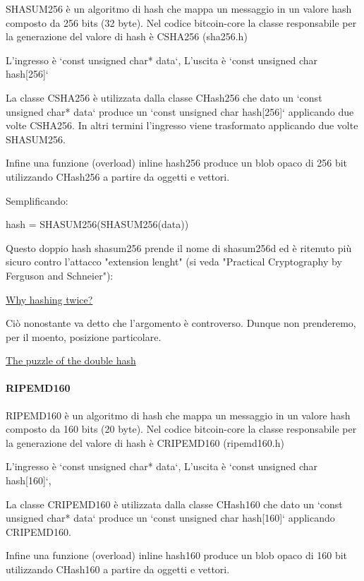 \documentclass{book}
\theoremstyle{definition}
\begin{document}
SHASUM256 è un algoritmo di hash che mappa un messaggio in un valore hash composto da 256 bits (32 byte).
Nel codice bitcoin-core la classe responsabile per la generazione del valore di hash è CSHA256 (sha256.h)

L'ingresso è `const unsigned char* data`,
L'uscita è `const unsigned char hash[256]`

La classe CSHA256 è utilizzata dalla classe CHash256 che dato un `const unsigned char* data` produce un `const unsigned char hash[256]`
applicando due volte CSHA256. In altri termini l'ingresso viene trasformato applicando due volte SHASUM256.

Infine una funzione (overload) inline hash256 produce un blob opaco di 256 bit utilizzando CHash256 a partire da oggetti e vettori.

Semplificando:

hash = SHASUM256(SHASUM256(data))

Questo doppio hash shasum256 prende il nome di shasum256d ed è ritenuto più sicuro contro l'attacco "extension lenght" (si veda "Practical Cryptography by Ferguson and Schneier"):

\href{https://crypto.stackexchange.com/questions/50017/why-hashing-twice}{Why hashing twice?}

Ciò nonostante va detto che l'argomento è controverso. Dunque non prenderemo, per il moento, posizione particolare.

\href{https://medium.com/@craig_10243/the-puzzle-of-the-double-hash-968196edb06d}{The puzzle of the double hash}

\paragraph{RIPEMD160}

RIPEMD160 è un algoritmo di hash che mappa un messaggio in un valore hash composto da 160 bits (20 byte).
Nel codice bitcoin-core la classe responsabile per la generazione del valore di hash è CRIPEMD160 (ripemd160.h)

L'ingresso è `const unsigned char* data`,
L'uscita è `const unsigned char hash[160]`,

La classe CRIPEMD160 è utilizzata dalla classe CHash160 che dato un `const unsigned char* data` produce un `const unsigned char hash[160]`
applicando CRIPEMD160.

Infine una funzione (overload) inline hash160 produce un blob opaco di 160 bit utilizzando CHash160 a partire da oggetti e vettori.
\end{document}
